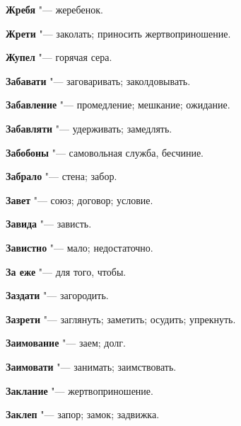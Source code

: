 \begin{mymulticols}{2}
\noindent\textbf{Жребя} "--- жеребенок. 




\noindent\textbf{Жрети} "--- заколать; приносить жертвоприношение. 




\noindent\textbf{Жупел} "--- горячая сера. 




\bukvaending






\noindent\textbf{Забавати} "--- заговаривать; заколдовывать. 




\noindent\textbf{Забавление} "--- промедление; мешкание; ожидание. 




\noindent\textbf{Забавляти} "--- удерживать; замедлять. 




\noindent\textbf{Забобоны} "--- самовольная служба, бесчиние. 




\noindent\textbf{Забрало} "--- стена; забор. 




\noindent\textbf{Завет} "--- союз; договор; условие. 




\noindent\textbf{Завида} "--- зависть. 




\noindent\textbf{Завистно} "--- мало; недостаточно. 




\noindent\textbf{За еже} "--- для того, чтобы. 




\noindent\textbf{Заздати} "--- загородить. 




\noindent\textbf{Зазрети} "--- заглянуть; заметить; осудить; упрекнуть. 




\noindent\textbf{Заимование} "--- заем; долг. 




\noindent\textbf{Заимовати} "--- занимать; заимствовать. 




\noindent\textbf{Заклание} "--- жертвоприношение. 




\noindent\textbf{Заклеп} "--- запор; замок; задвижка. 





\end{mymulticols}
